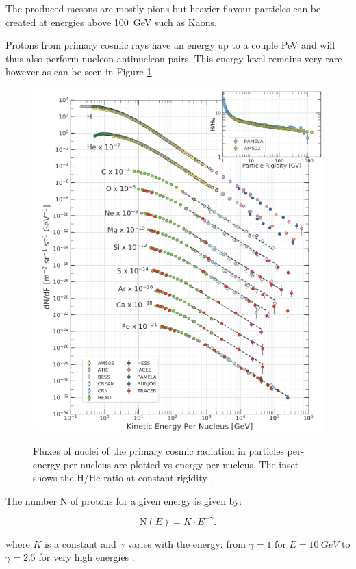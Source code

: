 The produced mesons are mostly pions but heavier flavour particles can be created at energies above \SI{100}{GeV} such as Kaons.

Protons from primary cosmic rays have an energy up to a couple PeV and will thus also perform nucleon-antinucleon pairs. This energy level remains very rare however as can be seen in Figure \ref{fig:knee}

\begin{figure}[htbp]
\centering
\includegraphics[width=\linewidth]{./fig/knee.png}
\label{fig:knee}
\caption{Fluxes of nuclei of the primary cosmic radiation in particles per-energy-per-nucleus are plotted vs energy-per-nucleus. The inset shows the H/He ratio at constant rigidity \cite{Tanabashi:2018oca}.}
\end{figure}

The number N of protons for a given energy is given by:

\begin{equation*}
\text{N}(E)=K\cdot E^{-\gamma}.
\end{equation*}

where $K$ is a constant and $\gamma$ varies with the energy: from $\gamma=1$ for $E=\SI{10}{GeV}$ to $\gamma=2.5$ for very high energies \cite{Tanabashi:2018oca}.

